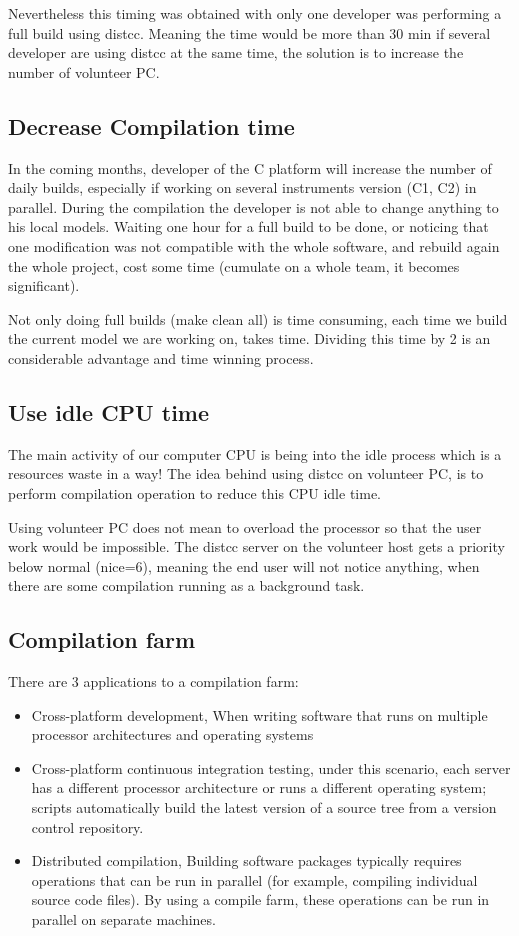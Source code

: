 \documentclass{article}
\begin{document}
Nevertheless this timing was obtained with only one developer was performing a
full build using distcc. Meaning the time would be more than 30 min if several
developer are using distcc at the same time, the solution is to increase the
number of volunteer PC.

\subsection{Decrease Compilation time}

In the coming months, developer of the C platform will increase the number of
daily builds, especially if working on several instruments version (C1, C2) in parallel.
During the compilation the developer is not able to change anything to his
local models. 
Waiting one hour for a full build to be done, or noticing that one
modification was not compatible with the whole software, and rebuild again the
whole project, cost some time (cumulate on a whole team, it becomes
significant).

Not only doing full builds (make clean all) is time consuming, each time we
build the current model we are working on, takes time. Dividing this time by 2
is an considerable advantage and time winning process.

\subsection{Use idle CPU time}

The main activity of our computer CPU is being into the idle process which is
a resources waste in a way! The idea behind using distcc on volunteer PC, is to
perform compilation operation to reduce this CPU idle time.

Using volunteer PC does not mean to overload the processor so that the user work
would be impossible. The distcc server on the volunteer host gets a priority
below normal (nice=6), meaning the end user will not notice anything, when there are
some compilation running as a background task.

\subsection{Compilation farm}

There are 3 applications to a compilation farm:~\cite{wikipedia}
\begin{itemize}
	\item Cross-platform development, When writing software that runs on multiple processor architectures and operating systems
	\item Cross-platform continuous integration testing, under this scenario, each
	server has a different processor architecture or runs a different operating system; scripts automatically build the latest version of a source tree from a version control repository. 
	\item Distributed compilation, Building software packages typically requires
	operations that can be run in parallel (for example, compiling individual source code files). By using a compile farm, these operations can be run in parallel on separate machines. 
\end{itemize}
\end{document}
